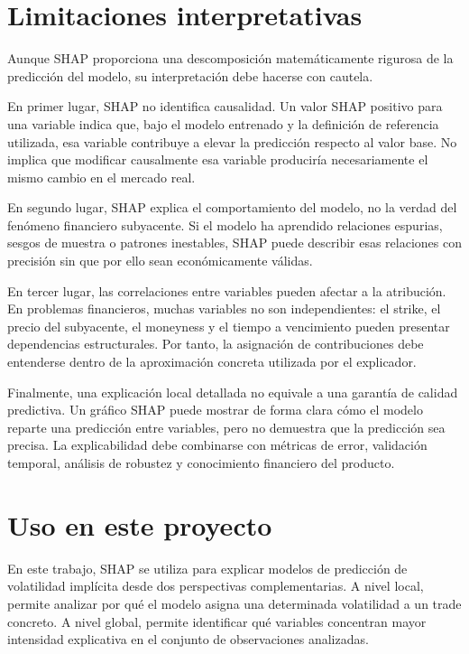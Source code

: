 \section{Limitaciones interpretativas}

Aunque SHAP proporciona una descomposición matemáticamente rigurosa de la predicción del modelo, su interpretación debe hacerse con cautela.

En primer lugar, SHAP no identifica causalidad. Un valor SHAP positivo para una variable indica que, bajo el modelo entrenado y la definición de referencia utilizada, esa variable contribuye a elevar la predicción respecto al valor base. No implica que modificar causalmente esa variable produciría necesariamente el mismo cambio en el mercado real.

En segundo lugar, SHAP explica el comportamiento del modelo, no la verdad del fenómeno financiero subyacente. Si el modelo ha aprendido relaciones espurias, sesgos de muestra o patrones inestables, SHAP puede describir esas relaciones con precisión sin que por ello sean económicamente válidas.

En tercer lugar, las correlaciones entre variables pueden afectar a la atribución. En problemas financieros, muchas variables no son independientes: el strike, el precio del subyacente, el moneyness y el tiempo a vencimiento pueden presentar dependencias estructurales. Por tanto, la asignación de contribuciones debe entenderse dentro de la aproximación concreta utilizada por el explicador.

Finalmente, una explicación local detallada no equivale a una garantía de calidad predictiva. Un gráfico SHAP puede mostrar de forma clara cómo el modelo reparte una predicción entre variables, pero no demuestra que la predicción sea precisa. La explicabilidad debe combinarse con métricas de error, validación temporal, análisis de robustez y conocimiento financiero del producto.

\section{Uso en este proyecto}

En este trabajo, SHAP se utiliza para explicar modelos de predicción de volatilidad implícita desde dos perspectivas complementarias. A nivel local, permite analizar por qué el modelo asigna una determinada volatilidad a un trade concreto. A nivel global, permite identificar qué variables concentran mayor intensidad explicativa en el conjunto de observaciones analizadas.

